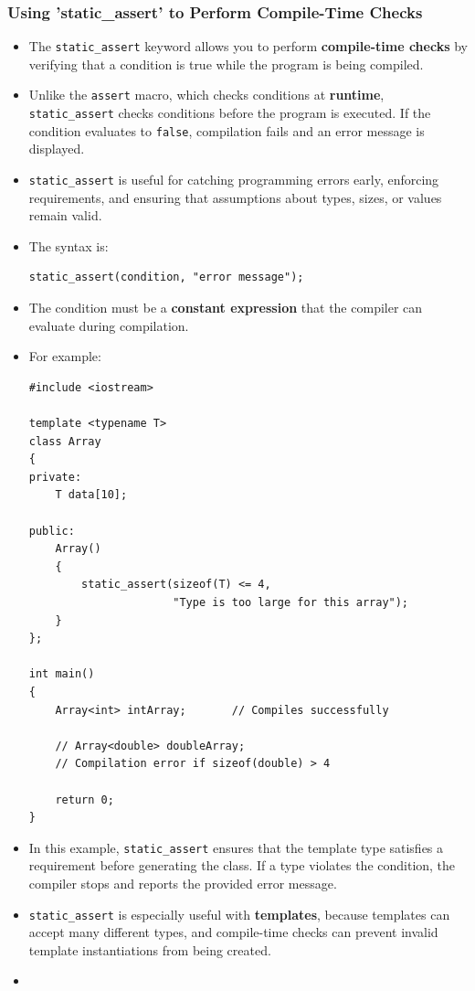 \documentclass[10pt]{article}
\newcommand{\pbreak}{\vspace{30pt}}
\begin{document}
\subsubsection{Using 'static\_assert' to Perform Compile-Time Checks}
\begin{itemize}
    \item The \verb|static_assert| keyword allows you to perform \textbf{compile-time checks} by verifying that a condition is true while the program is being compiled.

    \item Unlike the \verb|assert| macro, which checks conditions at \textbf{runtime}, \verb|static_assert| checks conditions before the program is executed. If the condition evaluates to \verb|false|, compilation fails and an error message is displayed.

    \item \verb|static_assert| is useful for catching programming errors early, enforcing requirements, and ensuring that assumptions about types, sizes, or values remain valid.

    \item The syntax is:
\begin{verbatim}
static_assert(condition, "error message");
\end{verbatim}

    \item The condition must be a \textbf{constant expression} that the compiler can evaluate during compilation.

    \item For example:
\begin{verbatim}
#include <iostream>

template <typename T>
class Array
{
private:
    T data[10];

public:
    Array()
    {
        static_assert(sizeof(T) <= 4,
                      "Type is too large for this array");
    }
};

int main()
{
    Array<int> intArray;       // Compiles successfully

    // Array<double> doubleArray;
    // Compilation error if sizeof(double) > 4

    return 0;
}
\end{verbatim}

    \item In this example, \verb|static_assert| ensures that the template type satisfies a requirement before generating the class. If a type violates the condition, the compiler stops and reports the provided error message.

    \item \verb|static_assert| is especially useful with \textbf{templates}, because templates can accept many different types, and compile-time checks can prevent invalid template instantiations from being created.

		\pbreak

\item {}
\end{itemize}
\end{document}
